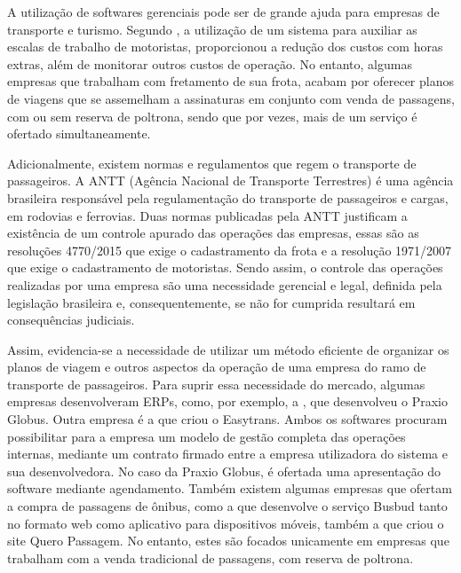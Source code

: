 \documentclass[12pt]{article}
\begin{document}
A utilização de softwares gerenciais pode ser de grande ajuda para empresas de transporte e turismo. Segundo \cite{perp}, a utilização de um sistema para auxiliar as escalas de trabalho de motoristas, proporcionou a redução dos custos com horas extras, além de monitorar outros custos de operação. No entanto, algumas empresas que trabalham com fretamento de sua frota, acabam por oferecer planos de viagens que se assemelham a assinaturas em conjunto com venda de passagens, com ou sem reserva de poltrona, sendo que por vezes, mais de um serviço é ofertado simultaneamente.

Adicionalmente, existem normas e regulamentos que regem o transporte de passageiros. A ANTT (Agência Nacional de Transporte Terrestres) é uma agência brasileira responsável pela regulamentação do transporte de passageiros e cargas, em rodovias e ferrovias. Duas normas publicadas pela ANTT justificam a existência de um controle apurado das operações das empresas, essas são as resoluções 4770/2015 \cite{br:2015} que exige o cadastramento da frota e a resolução 1971/2007 \cite{br:2007} que exige o cadastramento de motoristas. Sendo assim, o controle das operações realizadas por uma empresa são uma necessidade gerencial e legal, definida pela legislação brasileira e, consequentemente, se não for cumprida resultará em consequências judiciais.

Assim, evidencia-se a necessidade de utilizar um método eficiente de organizar os planos de viagem e outros aspectos da operação de uma empresa do ramo de transporte de passageiros. Para suprir essa necessidade do mercado, algumas empresas desenvolveram ERPs, como, por exemplo, a \cite{praxio}, que desenvolveu o Praxio Globus. Outra empresa é a \cite{easy} que criou o Easytrans. Ambos os softwares procuram possibilitar para a empresa um modelo de gestão completa das operações internas, mediante um contrato firmado entre a empresa utilizadora do sistema e sua desenvolvedora. No caso da Praxio Globus, é ofertada uma apresentação do software mediante agendamento. Também existem algumas empresas que ofertam a compra de passagens de ônibus, como a \cite{busbud} que desenvolve o serviço Busbud tanto no formato web como aplicativo para dispositivos móveis, também a \cite{qp} que criou o site Quero Passagem. No entanto, estes são focados unicamente em empresas que trabalham com a venda tradicional de passagens, com reserva de poltrona.
\end{document}
